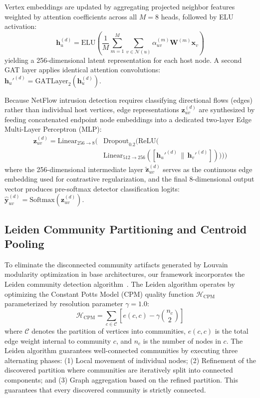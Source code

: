 \documentclass[12pt,a4paper]{report}
\begin{document}
Vertex embeddings are updated by aggregating projected neighbor features weighted by attention coefficients across all $M = 8$ heads, followed by ELU activation:
\begin{equation}
\boldsymbol{h}_u^{(d)} = \text{ELU}\left( \frac{1}{M} \sum_{m=1}^M \sum_{v \in \mathcal{N}(u)} \alpha_{uv}^{(m)} \boldsymbol{W}^{(m)} \boldsymbol{x}_v \right)
\label{eq:gat_node_update}
\end{equation}
yielding a 256-dimensional latent representation for each host node. A second GAT layer applies identical attention convolutions: $\boldsymbol{h}_u'^{(d)} = \text{GATLayer}_2(\boldsymbol{h}_u^{(d)})$.

Because NetFlow intrusion detection requires classifying directional flows (edges) rather than individual host vertices, edge representations $\boldsymbol{z}_{uv}^{(d)}$ are synthesized by feeding concatenated endpoint node embeddings into a dedicated two-layer Edge Multi-Layer Perceptron (MLP):
\begin{equation}
\begin{split}
\boldsymbol{z}_{uv}^{(d)} = \text{Linear}_{256 \to 8}\Big( & \text{Dropout}_{0.2}\big( \text{ReLU}\big( \\
& \text{Linear}_{512 \to 256}\left( [\boldsymbol{h}_u'^{(d)} \,\|\, \boldsymbol{h}_v'^{(d)}] \right) \big) \big) \Big)
\end{split}
\label{eq:edge_mlp_layer}
\end{equation}
where the 256-dimensional intermediate layer $\tilde{\boldsymbol{z}}_{uv}^{(d)}$ serves as the continuous edge embedding used for contrastive regularization, and the final 8-dimensional output vector produces pre-softmax detector classification logits: $\hat{\boldsymbol{y}}_{uv}^{(d)} = \text{Softmax}(\boldsymbol{z}_{uv}^{(d)})$.

\subsection{Leiden Community Partitioning and Centroid Pooling}
To eliminate the disconnected community artifacts generated by Louvain modularity optimization in base architectures, our framework incorporates the Leiden community detection algorithm~\cite{traag2019leiden}. The Leiden algorithm operates by optimizing the Constant Potts Model (CPM) quality function $\mathcal{H}_{\text{CPM}}$ parameterized by resolution parameter $\gamma = 1.0$:
\begin{equation}
\mathcal{H}_{\text{CPM}} = \sum_{c \in \mathcal{C}} \left[ e(c, c) - \gamma \binom{n_c}{2} \right]
\label{eq:cpm_quality}
\end{equation}
where $\mathcal{C}$ denotes the partition of vertices into communities, $e(c, c)$ is the total edge weight internal to community $c$, and $n_c$ is the number of nodes in $c$. The Leiden algorithm guarantees well-connected communities by executing three alternating phases: (1) Local movement of individual nodes; (2) Refinement of the discovered partition where communities are iteratively split into connected components; and (3) Graph aggregation based on the refined partition. This guarantees that every discovered community is strictly connected.
\end{document}
